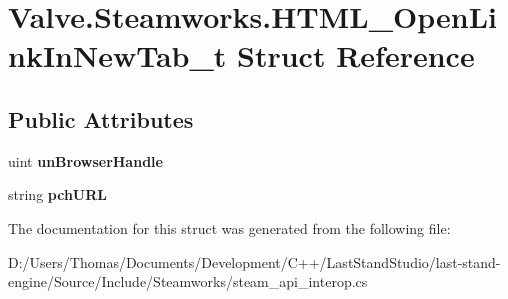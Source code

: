 \hypertarget{structValve_1_1Steamworks_1_1HTML__OpenLinkInNewTab__t}{}\section{Valve.\+Steamworks.\+H\+T\+M\+L\+\_\+\+Open\+Link\+In\+New\+Tab\+\_\+t Struct Reference}
\label{structValve_1_1Steamworks_1_1HTML__OpenLinkInNewTab__t}
\subsection*{Public Attributes}
\begin{DoxyCompactItemize}
\item 
\hypertarget{structValve_1_1Steamworks_1_1HTML__OpenLinkInNewTab__t_a965932495a8437389f2adf753150ee49}{}uint {\bfseries un\+Browser\+Handle}\label{structValve_1_1Steamworks_1_1HTML__OpenLinkInNewTab__t_a965932495a8437389f2adf753150ee49}

\item 
\hypertarget{structValve_1_1Steamworks_1_1HTML__OpenLinkInNewTab__t_a3c497d21979d0f0204896be15e660e4b}{}string {\bfseries pch\+U\+R\+L}\label{structValve_1_1Steamworks_1_1HTML__OpenLinkInNewTab__t_a3c497d21979d0f0204896be15e660e4b}

\end{DoxyCompactItemize}


The documentation for this struct was generated from the following file\+:\begin{DoxyCompactItemize}
\item 
D\+:/\+Users/\+Thomas/\+Documents/\+Development/\+C++/\+Last\+Stand\+Studio/last-\/stand-\/engine/\+Source/\+Include/\+Steamworks/steam\+\_\+api\+\_\+interop.\+cs\end{DoxyCompactItemize}
